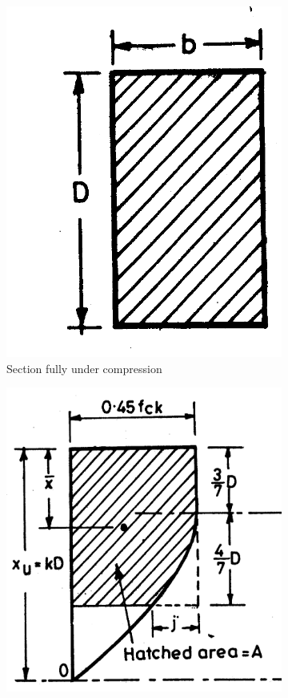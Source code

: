 \begin{figure}
\centering
\begin{subfigure}{0.3\textwidth}
\centering
\includegraphics[width=\textwidth]{images/sectionfullya.png}
\caption{Section fully under compression}
\label{fig:section}
\end{subfigure}
%
\begin{subfigure}{0.3\textwidth}
\centering
\includegraphics[width=\textwidth]{images/concreteb.png}

\end{subfigure}
\end{figure}
